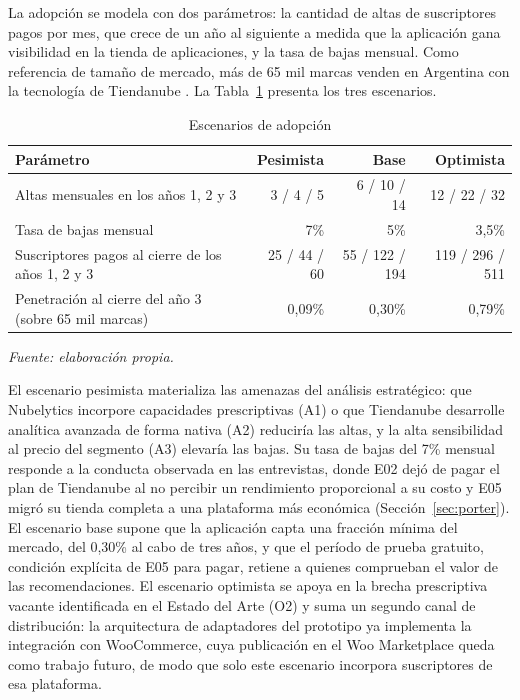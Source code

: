 La adopción se modela con dos parámetros: la cantidad de altas de suscriptores pagos por mes, que crece de un año al siguiente a medida que la aplicación gana visibilidad en la tienda de aplicaciones, y la tasa de bajas mensual. Como referencia de tamaño de mercado, más de 65 mil marcas venden en Argentina con la tecnología de Tiendanube \parencite{Calegari2026}. La Tabla~\ref{tab:viabilidad-escenarios} presenta los tres escenarios.

\begin{table}[!htbp]
\centering
\caption{Escenarios de adopción}
\label{tab:viabilidad-escenarios}
\renewcommand{\arraystretch}{1.3}
\footnotesize
\setlength{\tabcolsep}{4pt}
\begin{tabular}{|m{4.4cm}|r|r|r|}
\hline
\textbf{Parámetro} & \textbf{Pesimista} & \textbf{Base} & \textbf{Optimista} \\
\hline
Altas mensuales en los años 1, 2 y 3 & 3 / 4 / 5 & 6 / 10 / 14 & 12 / 22 / 32 \\
\hline
Tasa de bajas mensual & 7\% & 5\% & 3,5\% \\
\hline
Suscriptores pagos al cierre de los años 1, 2 y 3 & 25 / 44 / 60 & 55 / 122 / 194 & 119 / 296 / 511 \\
\hline
Penetración al cierre del año 3 (sobre 65 mil marcas) & 0,09\% & 0,30\% & 0,79\% \\
\hline
\end{tabular}

\smallskip
\noindent\textit{Fuente: elaboración propia.}
\end{table}

El escenario pesimista materializa las amenazas del análisis estratégico: que Nubelytics incorpore capacidades prescriptivas (A1) o que Tiendanube desarrolle analítica avanzada de forma nativa (A2) reduciría las altas, y la alta sensibilidad al precio del segmento (A3) elevaría las bajas. Su tasa de bajas del 7\% mensual responde a la conducta observada en las entrevistas, donde E02 dejó de pagar el plan de Tiendanube al no percibir un rendimiento proporcional a su costo y E05 migró su tienda completa a una plataforma más económica (Sección~\ref{sec:porter}). El escenario base supone que la aplicación capta una fracción mínima del mercado, del 0,30\% al cabo de tres años, y que el período de prueba gratuito, condición explícita de E05 para pagar, retiene a quienes comprueban el valor de las recomendaciones. El escenario optimista se apoya en la brecha prescriptiva vacante identificada en el Estado del Arte (O2) y suma un segundo canal de distribución: la arquitectura de adaptadores del prototipo ya implementa la integración con WooCommerce, cuya publicación en el Woo Marketplace queda como trabajo futuro, de modo que solo este escenario incorpora suscriptores de esa plataforma.

